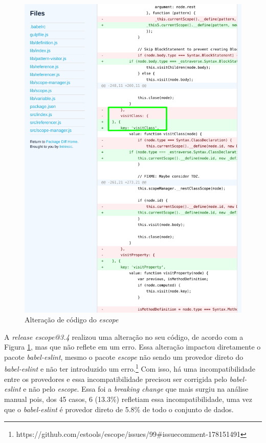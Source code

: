 \begin{itemize}
    \begin{figure}
        \centering
       \includegraphics[scale=0.7]{figuras/bc_category_incompatibles_providers.pdf}
        \caption{Alteração de código do \textit{escope}}
        \label{fig:bc_category_incompatibles_providers}
    \end{figure}{}

    A \textit{release escope@3.4} realizou uma alteração no seu código, de acordo com a Figura \ref{fig:bc_category_incompatibles_providers}, mas que não reflete em um erro. Essa alteração impactou diretamente o pacote \textit{babel-eslint}, mesmo o pacote \textit{escope} não sendo um provedor direto do \textit{babel-eslint} e não ter introduzido um erro.\footnote{https://github.com/estools/escope/issues/99\#issuecomment-178151491} Com isso, há uma incompatibilidade entre os provedores e essa incompatibilidade precisou ser corrigida pelo \textit{babel-eslint} e não pelo \textit{escope}. Essa foi a \textit{breaking change} que mais surgiu na análise manual pois, dos 45 casos, 6 (13.3\%) refletiam essa incompatibilidade, uma vez que o \textit{babel-eslint} é provedor direto de 5.8\% de todo o conjunto de dados.


\end{itemize}
